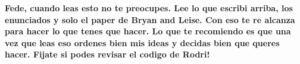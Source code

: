 \textbf{Fede, cuando leas esto no te preocupes. Lee lo que escribi arriba, los enunciados y solo el paper de Bryan and Leise. Con eso te re alcanza para hacer lo que tenes que hacer. Lo que te recomiendo es que una vez que leas eso ordenes bien mis ideas y decidas bien que queres hacer. Fijate si podes revisar el codigo de Rodri!}

